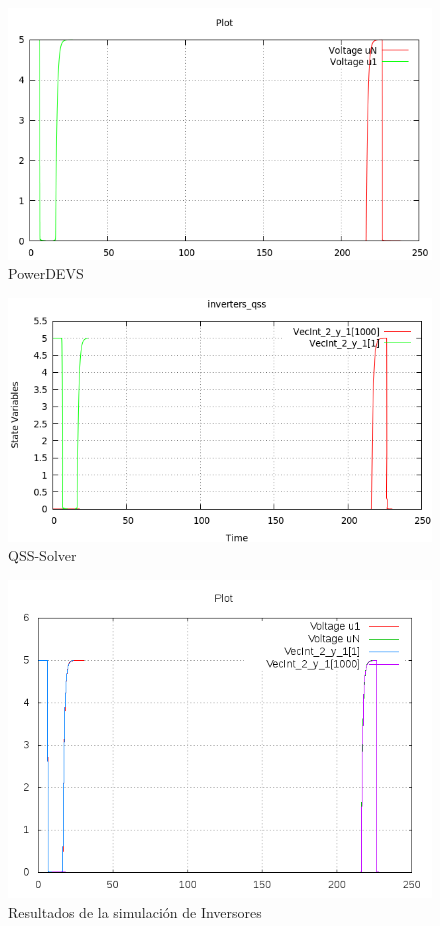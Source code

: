 \begin{figure}[H]
\centering
\begin{minipage}{0.5\textwidth}
 \includegraphics[width=\linewidth]{inversers-pd.png}
\centering
PowerDEVS
\end{minipage}\hfill
\begin{minipage}{0.5\textwidth}
 \includegraphics[width=\linewidth]{inversers-qss.png}
\centering
QSS-Solver
\end{minipage}
\includegraphics[width=\linewidth]{output/inverters/inverters-all}
\caption{Resultados de la simulación de Inversores}\label{graph:inverters}
\end{figure}


